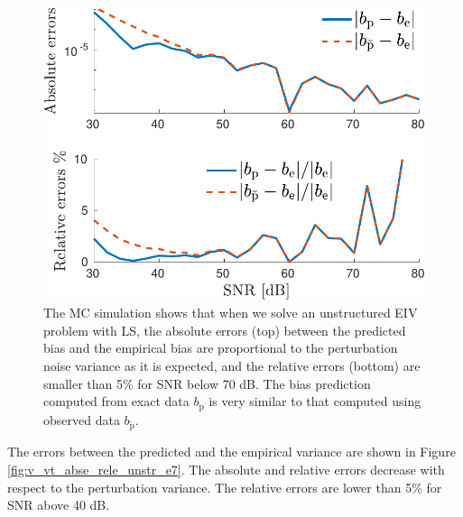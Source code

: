 \begin{figure}[htb!]
  \centering
  \includegraphics[width=1\columnwidth]{./ChapterStatisticalAnalysis/fig/Fig_2.pdf} 
  \caption{ \label{fig:b_bt_abse_rele_unstr_e7} The MC simulation shows that when we solve an unstructured EIV problem with LS, the absolute errors (top) between the predicted bias and the empirical bias are proportional to the perturbation noise variance as it is expected, and the relative errors (bottom) are smaller than 5\% for SNR below 70 dB. The bias prediction computed from exact data ${b}_\mathrm{p}$ is very similar to that computed using observed data $b_{\widetilde{\mathrm{p}}}$. } 
\end{figure}

The errors between the predicted and the empirical variance are shown in Figure \ref{fig:v_vt_abse_rele_unstr_e7}.
The absolute and relative errors decrease with respect to the perturbation variance.
The relative errors are lower than 5\% for SNR above 40 dB. 

